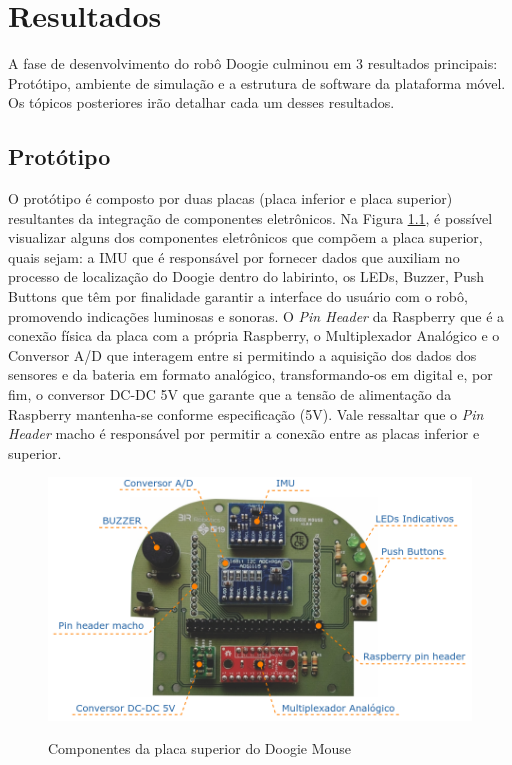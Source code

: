 \chapter{Resultados}
\label{chap:resultados}
A fase de desenvolvimento do robô Doogie culminou em 3 resultados principais: Protótipo, ambiente de simulação e a estrutura de software da plataforma móvel. Os tópicos posteriores irão detalhar cada um desses resultados. 

\section{Protótipo}
\label{sec:resultado_prototipo}
O protótipo é composto por duas placas (placa inferior e placa superior) resultantes da integração de componentes eletrônicos. Na Figura \ref{fig:top_board_elementos}, é possível visualizar alguns dos componentes eletrônicos que compõem a placa superior, quais sejam: a IMU que é responsável por fornecer dados que auxiliam no processo de localização do Doogie dentro do labirinto, os LEDs, Buzzer, Push Buttons que têm por finalidade garantir a interface do usuário com o robô, promovendo indicações luminosas e sonoras. O \textit{Pin Header} da Raspberry que é a conexão física da placa com a própria Raspberry, o Multiplexador Analógico e o Conversor A/D que interagem entre si permitindo a aquisição dos dados dos sensores e da bateria em formato analógico, transformando-os em digital e, por fim, o conversor DC-DC 5V que garante que a tensão de alimentação da Raspberry mantenha-se conforme especificação (5V). Vale ressaltar que o \textit{Pin Header} macho é responsável por permitir a conexão entre as placas inferior e superior.

\begin{figure}[H]
	\centering
	\caption{Componentes da placa superior do Doogie Mouse}
	\includegraphics[width=1\textwidth]
	{Figures/top_board_elementos.png}
	\label{fig:top_board_elementos}
\end{figure}

